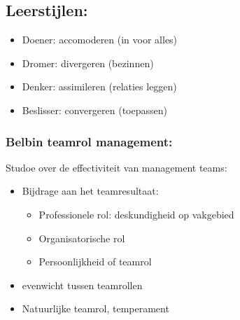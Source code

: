 \documentclass[12pt]{article}
\begin{document}
\subsection{Leerstijlen:}
\begin{itemize}
    \item Doener: accomoderen (in voor alles)
    \item Dromer: divergeren (bezinnen)
    \item Denker: assimileren (relaties leggen)
    \item Beslisser: convergeren (toepassen)
\end{itemize}
\subsubsection{Belbin teamrol management:}
Studoe over de effectiviteit van management teams:\begin{itemize}
    \item Bijdrage aan het teamresultaat:\begin{itemize}
        \item Professionele rol: deskundigheid op vakgebied
        \item Organisatorische rol
        \item Persoonlijkheid of teamrol
    \end{itemize}
    \item evenwicht tussen teamrollen 
    \item Natuurlijke teamrol, temperament
\end{itemize}
\end{document}
